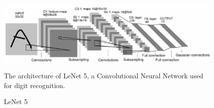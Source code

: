 \begin{figure}[!htb]	\includegraphics[width=\linewidth]{images/lenet5.png} \caption{LeNet 5}
    
	The architecture of LeNet 5, a Convolutional Neural Network used for digit recognition. \cite{LeCun1998Gradient-basedRecognition}

	\label{fig:lenet}
\end{figure}